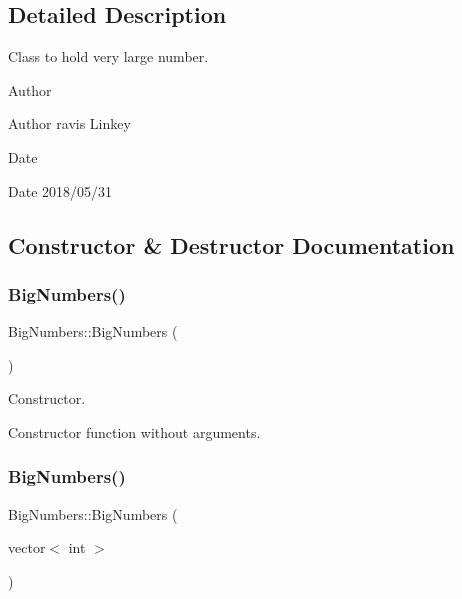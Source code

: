 \subsection{Detailed Description}
Class to hold very large number. 

\begin{DoxyAuthor}{Author}

\end{DoxyAuthor}
\begin{DoxyParagraph}{Author}
ravis Linkey 
\end{DoxyParagraph}


\begin{DoxyDate}{Date}

\end{DoxyDate}
\begin{DoxyParagraph}{Date}
2018/05/31 
\end{DoxyParagraph}


\subsection{Constructor \& Destructor Documentation}
\mbox{\label{classBigNumbers_af3dd82883f10f3473ac83280f26b0ad8}} 
\subsubsection{\texorpdfstring{Big\+Numbers()}{BigNumbers()}\hspace{0.1cm}{\footnotesize\ttfamily [1/2]}}
{\footnotesize\ttfamily Big\+Numbers\+::\+Big\+Numbers (\begin{DoxyParamCaption}{ }\end{DoxyParamCaption})}



Constructor. 

Constructor function without arguments. \mbox{\label{classBigNumbers_a1bdf450fbccb23f66ac642fdd54126ee}} 
\subsubsection{\texorpdfstring{Big\+Numbers()}{BigNumbers()}\hspace{0.1cm}{\footnotesize\ttfamily [2/2]}}
{\footnotesize\ttfamily Big\+Numbers\+::\+Big\+Numbers (\begin{DoxyParamCaption}\item[{vector$<$ int $>$}]{ }\end{DoxyParamCaption})}

